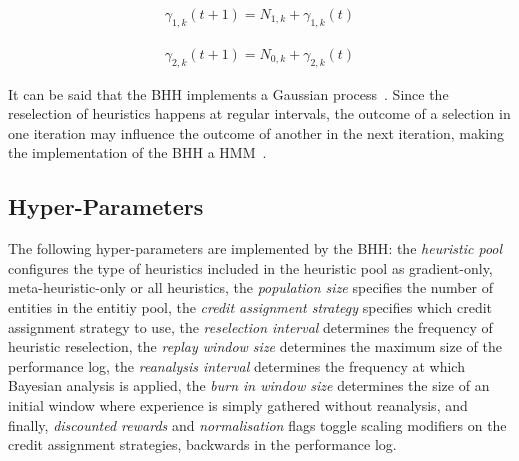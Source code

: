 \begin{equation}
	\label{eq:bhh:optimisation_step:map:gamma1_update_operation}
	\begin{split}
		\gamma_{1,k}(t+1) = N_{1,k} + \gamma_{1,k}(t)
	\end{split}
\end{equation}

\begin{equation}
	\label{eq:bhh:optimisation_step:map:gamma2_update_operation}
	\begin{split}
		\gamma_{2,k}(t+1) = N_{0,k} + \gamma_{2,k}(t)
	\end{split}
\end{equation}

It can be said that the \acs{BHH} implements a Gaussian process~\cite{ref:gortler:2019}. Since the reselection of heuristics happens at regular intervals, the outcome of a selection in one iteration may influence the outcome of another in the next iteration, making the implementation of the \acs{BHH} a \acs{HMM}~\cite{ref:rabiner:1986}.


\subsection{Hyper-Parameters}\label{sec:bhh:hyper_parameters}

The following hyper-parameters are implemented by the \acs{BHH}: the \textit{heuristic pool} configures the type of heuristics included in the heuristic pool as gradient-only, meta-heuristic-only or all heuristics, the \textit{population size} specifies the number of entities in the entitiy pool, the \textit{credit assignment strategy} specifies which credit assignment strategy to use, the \textit{reselection interval} determines the frequency of heuristic reselection, the \textit{replay window size} determines the maximum size of the performance log, the \textit{reanalysis interval} determines the frequency at which Bayesian analysis is applied, the \textit{burn in window size} determines the size of an initial window where experience is simply gathered without reanalysis, and finally, \textit{discounted rewards} and \textit{normalisation} flags toggle scaling modifiers on the credit assignment strategies, backwards in the performance log.
